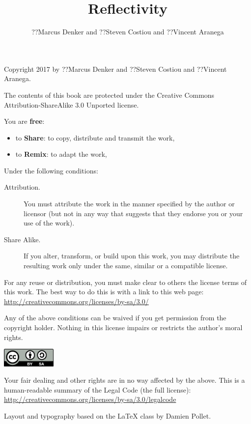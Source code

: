 \documentclass[10pt,twoside,english]{_support/latex/sbabook/sbabook}
\title{Reflectivity}
\author{??Marcus Denker and ??Steven Costiou and ??Vincent Aranega}
\begin{document}
\maketitle
\pagestyle{titlingpage}
\thispagestyle{titlingpage} %

\cleartoverso
{\small

  Copyright 2017 by ??Marcus Denker and ??Steven Costiou and ??Vincent Aranega.

  The contents of this book are protected under the Creative Commons
  Attribution-ShareAlike 3.0 Unported license.

  You are \textbf{free}:
  \begin{itemize}
  \item to \textbf{Share}: to copy, distribute and transmit the work,
  \item to \textbf{Remix}: to adapt the work,
  \end{itemize}

  Under the following conditions:
  \begin{description}
  \item[Attribution.] You must attribute the work in the manner specified by the
    author or licensor (but not in any way that suggests that they endorse you
    or your use of the work).
  \item[Share Alike.] If you alter, transform, or build upon this work, you may
    distribute the resulting work only under the same, similar or a compatible
    license.
  \end{description}

  For any reuse or distribution, you must make clear to others the
  license terms of this work. The best way to do this is with a link to
  this web page: \\
  \url{http://creativecommons.org/licenses/by-sa/3.0/}

  Any of the above conditions can be waived if you get permission from
  the copyright holder. Nothing in this license impairs or restricts the
  author's moral rights.

  \begin{center}
    \includegraphics[width=0.2\textwidth]{_support/latex/sbabook/CreativeCommons-BY-SA.pdf}
  \end{center}

  Your fair dealing and other rights are in no way affected by the
  above. This is a human-readable summary of the Legal Code (the full
  license): \\
  \url{http://creativecommons.org/licenses/by-sa/3.0/legalcode}

  \vfill

  Layout and typography based on the  \LaTeX{} class by Damien
  Pollet.
}
\end{document}
